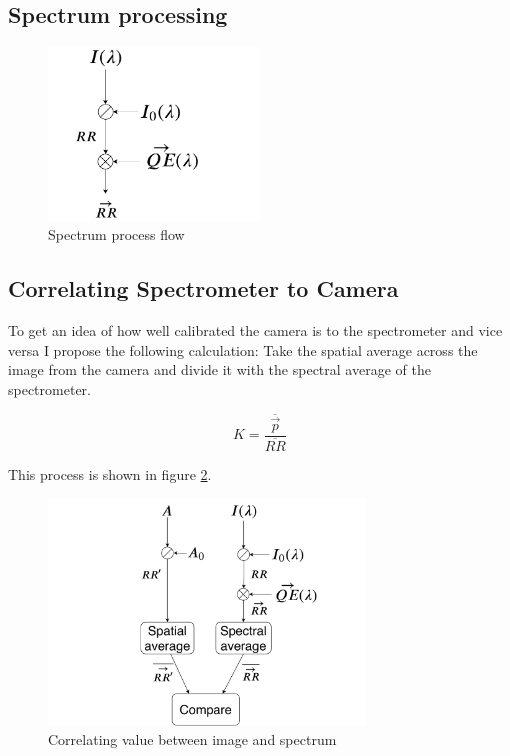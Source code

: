 \documentclass{article}
\newcommand*\mean[1]{\overline{#1}}
\begin{document}
\subsection{Spectrum processing}
\label{sec:spectrum_processing}

\begin{figure}[h]
    \centering
    \includegraphics[width=0.5\textwidth]{figures/thesis_program_flow.pdf}
    \caption{Spectrum process flow}
    \label{fig:spectrum_process_flow}
\end{figure}

\subsection{Correlating Spectrometer to Camera}
\label{sec:method_correlating_spectrum_to_camera}
To get an idea of how well calibrated the camera is to the spectrometer and vice versa I propose the following calculation: 
Take the spatial average across the image from the camera and divide it with the spectral average of the spectrometer. 

\begin{equation}
    \label{eq:correlating_spectrum_to_camera}
    K = \frac{\mean{\vec{p}}}{\mean{RR}}
\end{equation}

This process is shown in figure \ref{fig:correlating_spectrum_and_image}.

\begin{figure}[h]
    \centering
    \includegraphics[width=0.75\textwidth]{figures/image_comparison_with_spectrometer.pdf}
    \caption{Correlating value between image and spectrum}
    \label{fig:correlating_spectrum_and_image}
\end{figure}
\end{document}
